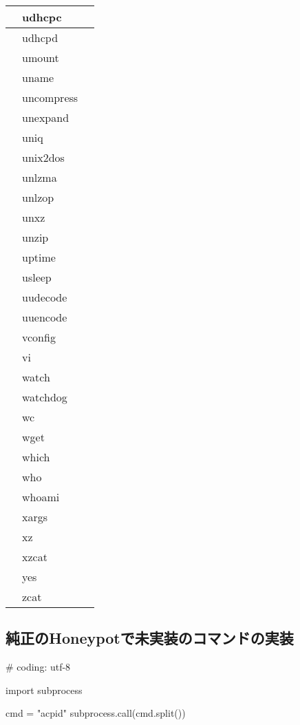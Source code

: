 \begin{longtable}{llp{50mm}}
 & udhcpc &  \\ \hline
 & udhcpd &  \\ \hline
 & umount &  \\ \hline
 & uname &  \\ \hline
 & uncompress &  \\ \hline
 & unexpand &  \\ \hline
 & uniq &  \\ \hline
 & unix2dos &  \\ \hline
 & unlzma &  \\ \hline
 & unlzop &  \\ \hline
 & unxz &  \\ \hline
 & unzip &  \\ \hline
 & uptime &  \\ \hline
 & usleep &  \\ \hline
 & uudecode &  \\ \hline
 & uuencode &  \\ \hline
 & vconfig &  \\ \hline
 & vi &  \\ \hline
 & watch &  \\ \hline
 & watchdog &  \\ \hline
 & wc &  \\ \hline
 & wget &  \\ \hline
 & which &  \\ \hline
 & who &  \\ \hline
 & whoami &  \\ \hline
 & xargs &  \\ \hline
 & xz &  \\ \hline
 & xzcat &  \\ \hline
 & yes &  \\ \hline
 & zcat &  \\ \hline

\end{longtable}

\subsection{純正のHoneypotで未実装のコマンドの実装}
\label{appd:implofcommand}

\begin{mylisting}[label={lst:acpid},language=sh,caption=acpid]
# coding: utf-8

import subprocess

cmd = "acpid"
subprocess.call(cmd.split())
\end{mylisting}

